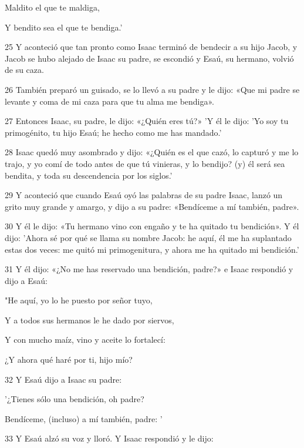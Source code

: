 \par    
\par     Maldito el que te maldiga,  
\par     Y bendito sea el que te bendiga.'
\par    
\par 25 Y aconteció que tan pronto como Isaac terminó de bendecir a su hijo Jacob, y Jacob se hubo alejado de Isaac su padre, se escondió y Esaú, su hermano, volvió de su caza.
\par 26 También preparó un guisado, se lo llevó a su padre y le dijo: «Que mi padre se levante y coma de mi caza para que tu alma me bendiga».
\par 27 Entonces Isaac, su padre, le dijo: «¿Quién eres tú?» 'Y él le dijo: 'Yo soy tu primogénito, tu hijo Esaú; he hecho como me has mandado.'
\par 28 Isaac quedó muy asombrado y dijo: «¿Quién es el que cazó, lo capturó y me lo trajo, y yo comí de todo antes de que tú vinieras, y lo bendijo? (y) él será sea ​​bendita, y toda su descendencia por los siglos.'
\par 29 Y aconteció que cuando Esaú oyó las palabras de su padre Isaac, lanzó un grito muy grande y amargo, y dijo a su padre: «Bendíceme a mí también, padre».
\par 30 Y él le dijo: «Tu hermano vino con engaño y te ha quitado tu bendición». Y él dijo: 'Ahora sé por qué se llama su nombre Jacob: he aquí, él me ha suplantado estas dos veces: me quitó mi primogenitura, y ahora me ha quitado mi bendición.'
\par 31 Y él dijo: «¿No me has reservado una bendición, padre?» e Isaac respondió y dijo a Esaú:
\par    
\par     "He aquí, yo lo he puesto por señor tuyo,  
\par     Y a todos sus hermanos le he dado por siervos,  
\par     Y con mucho maíz, vino y aceite lo fortalecí:
\par    
\par     ¿Y ahora qué haré por ti, hijo mío?
\par    
\par 32 Y Esaú dijo a Isaac su padre:  
\par     '¿Tienes sólo una bendición, oh padre?  
\par     Bendíceme, (incluso) a mí también, padre: '
\par    
\par 33 Y Esaú alzó su voz y lloró. Y Isaac respondió y le dijo:
